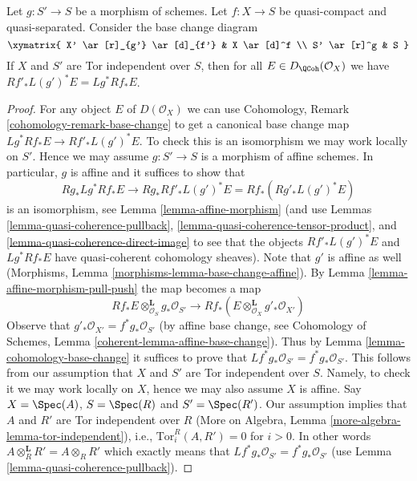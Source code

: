 \begin{lemma}
\label{lemma-compare-base-change}
Let $g : S' \to S$ be a morphism of schemes.
Let $f : X \to S$ be quasi-compact and quasi-separated.
Consider the base change diagram
$$
\xymatrix{
X' \ar[r]_{g'} \ar[d]_{f'} &
X \ar[d]^f \\
S' \ar[r]^g &
S
}
$$
If $X$ and $S'$ are Tor independent over $S$, then for all
$E \in D_\QCoh(\mathcal{O}_X)$ we have
$Rf'_*L(g')^*E = Lg^*Rf_*E$.
\end{lemma}

\begin{proof}
For any object $E$ of $D(\mathcal{O}_X)$ we can use
Cohomology, Remark \ref{cohomology-remark-base-change} to get a
canonical base change map $Lg^*Rf_*E \to Rf'_*L(g')^*E$. To check this
is an isomorphism we may work locally on $S'$. Hence we may assume
$g : S' \to S$ is a morphism of affine schemes. In particular, $g$
is affine and it suffices to show that
$$
Rg_*Lg^*Rf_*E \to Rg_*Rf'_*L(g')^*E = Rf_*(Rg'_* L(g')^* E)
$$
is an isomorphism, see Lemma \ref{lemma-affine-morphism}
(and use Lemmas \ref{lemma-quasi-coherence-pullback},
\ref{lemma-quasi-coherence-tensor-product}, and
\ref{lemma-quasi-coherence-direct-image}
to see that the objects $Rf'_*L(g')^*E$ and $Lg^*Rf_*E$
have quasi-coherent cohomology sheaves). Note that $g'$ is
affine as well (Morphisms, Lemma \ref{morphisms-lemma-base-change-affine}).
By Lemma \ref{lemma-affine-morphism-pull-push} the map becomes a map
$$
Rf_*E \otimes_{\mathcal{O}_S}^\mathbf{L} g_*\mathcal{O}_{S'}
\longrightarrow
Rf_*(E \otimes_{\mathcal{O}_X}^\mathbf{L} g'_*\mathcal{O}_{X'})
$$
Observe that $g'_*\mathcal{O}_{X'} = f^*g_*\mathcal{O}_{S'}$ (by affine
base change, see Cohomology of Schemes, Lemma
\ref{coherent-lemma-affine-base-change}).
Thus by
Lemma \ref{lemma-cohomology-base-change} it suffices to prove that
$Lf^*g_*\mathcal{O}_{S'} = f^*g_*\mathcal{O}_{S'}$. This follows from our
assumption that $X$ and $S'$ are Tor independent over $S$. Namely, to
check it we may work locally on $X$, hence we may also assume $X$ is affine.
Say $X = \Spec(A)$, $S = \Spec(R)$ and $S' = \Spec(R')$. Our assumption
implies that $A$ and $R'$ are Tor independent over $R$
(More on Algebra, Lemma \ref{more-algebra-lemma-tor-independent}), i.e.,
$\text{Tor}_i^R(A, R') = 0$ for $i > 0$. In other words
$A \otimes_R^\mathbf{L} R' = A \otimes_R R'$ which exactly means
that $Lf^*g_*\mathcal{O}_{S'} = f^*g_*\mathcal{O}_{S'}$
(use Lemma \ref{lemma-quasi-coherence-pullback}).
\end{proof}

